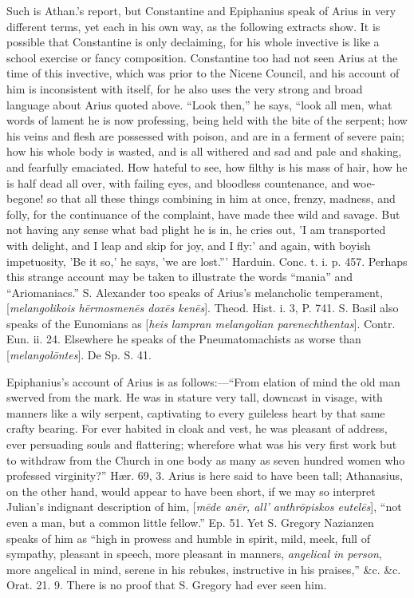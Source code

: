Such is Athan.'s report, but Constantine and
Epiphanius speak of Arius in very different terms, yet each in his own
way, as the following extracts show. It is possible that Constantine
is only declaiming, for his whole invective is like a school exercise
or fancy composition. Constantine too had not seen Arius at the time
of this invective, which was prior to the Nicene Council, and his
account of him is inconsistent with itself, for he also uses the very
strong and broad language about Arius quoted above. ``Look then,'' he
says, ``look all men, what words of lament he is now professing, being
held with the bite of the serpent; how his veins and flesh are
possessed with poison, and are in a ferment of severe pain; how his
whole body is wasted, and is all withered and sad and pale and
shaking, and fearfully emaciated. How hateful to see, how filthy is
his mass of hair, how he is half dead all over, with failing eyes, and
bloodless countenance, and woe-begone! so that all these things
combining in him at once, frenzy, madness, and folly, for the
continuance of the complaint, have made thee wild and savage. But not
having any sense what bad plight he is in, he cries out, 'I am
transported with delight, and I leap and skip for joy, and I fly:' and
again, with boyish impetuosity, 'Be it so,' he says, 'we are lost.'''
Harduin. Conc. t. i. p. 457. Perhaps this strange account may be taken
to illustrate the words ``mania'' and ``Ariomaniacs.'' S. Alexander too
speaks of Arius's melancholic temperament, [\emph{melangolikois h\={e}rmosmen\={e}s
dox\={e}s ken\={e}s}]. Theod. Hist. i. 3, P. 741. S. Basil
also speaks of the Eunomians as [\emph{heis lampran melangolian
parenechthentas}]. Contr. Eun. ii. 24. Elsewhere he speaks of the
Pneumatomachists as worse than [\emph{melangol\={o}ntes}]. De Sp.
S. 41.

Epiphanius's account of Arius is as follows:—``From
elation of mind the old man swerved from the mark. He was in stature
very tall, downcast in visage, with manners like a wily serpent,
captivating to every guileless heart by that same crafty bearing. For
ever habited in cloak and vest, he was pleasant of address, ever
persuading souls and flattering; wherefore what was his very first
work but to withdraw from the Church in one body as many as seven
hundred women who professed virginity?'' Hær. 69, 3. Arius is here
said to have been tall; Athanasius, on the other hand, would appear to
have been short, if we may so interpret Julian's indignant description
of him, [\emph{m\={e}de an\={e}r, all' anthr\={o}piskos eutel\={e}s}],
``not even a man, but a common little fellow.'' Ep. 51. Yet S. Gregory
Nazianzen speaks of him as ``high in prowess and humble in spirit,
mild, meek, full of sympathy, pleasant in speech, more pleasant in
manners, \emph{angelical in person}, more angelical in mind, serene in
his rebukes, instructive in his praises,'' \&c. \&c. Orat. 21. 9.
There is no proof that S. Gregory had ever seen him.


